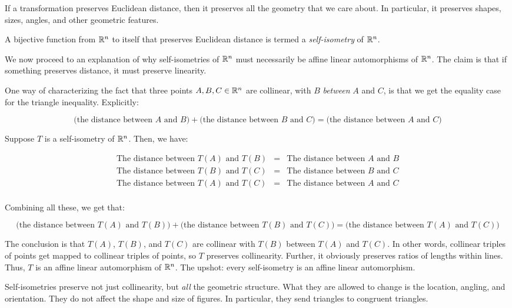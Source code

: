 \documentclass[10pt]{amsart}
\begin{document}
If a transformation preserves Euclidean distance, then it preserves
all the geometry that we care about. In particular, it preserves
shapes, sizes, angles, and other geometric features.

A bijective function from $\mathbb{R}^n$ to itself that preserves Euclidean
distance is termed a {\em self-isometry} of $\mathbb{R}^n$.

We now proceed to an explanation of why self-isometries of $\mathbb{R}^n$ must
necessarily be affine linear automorphisms of $\mathbb{R}^n$. The claim is
that if something preserves distance, it must preserve linearity.

One way of characterizing the fact that three points $A,B,C \in \mathbb{R}^n$
are collinear, with $B$ {\em between} $A$ and $C$, is that we get the
equality case for the triangle inequality. Explicitly:

$$\text{(the distance between $A$ and $B$)} + \text{(the distance between $B$ and $C$)} = \text{(the distance between $A$ and $C$)}$$

Suppose $T$ is a self-isometry of $\mathbb{R}^n$. Then, we have:

\begin{eqnarray*}
  \text{The distance between $T(A)$ and $T(B)$} & = & \text{The distance between $A$ and $B$}\\
  \text{The distance between $T(B)$ and $T(C)$} & = & \text{The distance between $B$ and $C$}\\
  \text{The distance between $T(A)$ and $T(C)$} & = & \text{The distance between $A$ and $C$}\\
\end{eqnarray*}

Combining all these, we get that:

$$\text{(the distance between $T(A)$ and $T(B)$)} + \text{(the distance between $T(B)$ and $T(C)$)} = \text{(the distance between $T(A)$ and $T(C)$)}$$

The conclusion is that $T(A)$, $T(B)$, and $T(C)$ are collinear with
$T(B)$ between $T(A)$ and $T(C)$. In other words, collinear triples of
points get mapped to collinear triples of points, so $T$ preserves
collinearity. Further, it obviously preserves ratios of lengths within
lines. Thus, $T$ is an affine linear automorphism of $\mathbb{R}^n$. The
upshot: every self-isometry is an affine linear automorphism.

Self-isometries preserve not just collinearity, but {\em all} the
geometric structure. What they are allowed to change is the location,
angling, and orientation. They do not affect the shape and size of
figures. In particular, they send triangles to congruent triangles.
\end{document}
